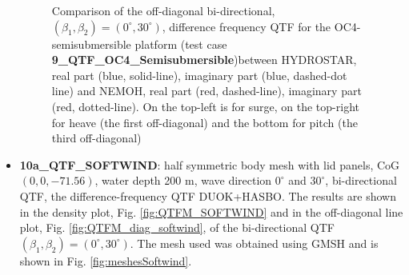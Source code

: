 \documentclass[12pt,a4paper,titlepage]{article}
\begin{document}
\begin{itemize}
\begin{figure}[h!tbp]
{}
	\caption{Comparison of the off-diagonal bi-directional, $(\beta_1,\beta_2)=(0^{\circ},30^{\circ})$, difference frequency QTF for the OC4-semisubmersible platform (test case \textbf{9\_QTF\_OC4\_Semisubmersible})between HYDROSTAR, real part (blue, solid-line), imaginary part (blue, dashed-dot line) and NEMOH, real part (red, dashed-line), imaginary part (red, dotted-line). On the top-left is for surge, on the top-right for heave (the first off-diagonal) and the bottom for pitch (the third off-diagonal)}\label{fig:QTFM_diag_OC4}
\end{figure}

\item \textbf{10a\_QTF\_SOFTWIND}: half symmetric body mesh with lid panels, CoG $(0,0,-71.56)$, water depth 200 m, wave direction $0^{\circ}$ and $30^{\circ}$, bi-directional QTF, the difference-frequency QTF DUOK+HASBO. The results are shown in the density plot, Fig. \ref{fig:QTFM_SOFTWIND} and in the off-diagonal line plot, Fig. \ref{fig:QTFM_diag_softwind}, of the bi-directional QTF $(\beta_1,\beta_2)=(0^{\circ},30^{\circ})$. The mesh used was obtained using GMSH \cite{gmsh} and is shown in Fig. \ref{fig:meshesSoftwind}.


\end{itemize}
\end{document}
